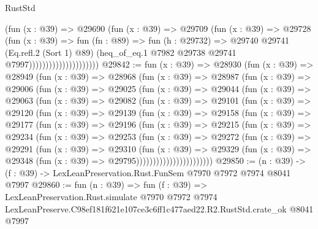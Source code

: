 \begin{lexlean}{RustStd}
\begin{coremodule}
                                    (fun (x : @39) =>
                                    @29690
                                      (fun (x : @39) =>
                                      @29709
                                        (fun (x : @39) =>
                                        @29728
                                          (fun (x : @39) =>
                                          fun (fn : @89) =>
                                          fun (h : @29732) =>
                                          @29740
                                            @29741
                                            (Eq.refl.{2} (Sort 1) @89)
                                            (heq_of_eq.{1}
                                              @7982
                                              @29738
                                              @29741
                                              @7997)))))))))))))))))))))
@29842 := fun (x : @39) =>
  @28930
    (fun (x : @39) =>
    @28949
      (fun (x : @39) =>
      @28968
        (fun (x : @39) =>
        @28987
          (fun (x : @39) =>
          @29006
            (fun (x : @39) =>
            @29025
              (fun (x : @39) =>
              @29044
                (fun (x : @39) =>
                @29063
                  (fun (x : @39) =>
                  @29082
                    (fun (x : @39) =>
                    @29101
                      (fun (x : @39) =>
                      @29120
                        (fun (x : @39) =>
                        @29139
                          (fun (x : @39) =>
                          @29158
                            (fun (x : @39) =>
                            @29177
                              (fun (x : @39) =>
                              @29196
                                (fun (x : @39) =>
                                @29215
                                  (fun (x : @39) =>
                                  @29234
                                    (fun (x : @39) =>
                                    @29253
                                      (fun (x : @39) =>
                                      @29272
                                        (fun (x : @39) =>
                                        @29291
                                          (fun (x : @39) =>
                                          @29310
                                            (fun (x : @39) =>
                                            @29329
                                              (fun (x : @39) =>
                                              @29348 (fun (x : @39) => @29795)))))))))))))))))))))))
@29850 := (n : @39) -> (f : @39) -> LexLeanPreservation.Rust.FunSem @7970 @7972 @7974 @8041 @7997
@29860 := fun (n : @39) =>
  fun (f : @39) =>
  LexLeanPreservation.Rust.simulate
    @7970
    @7972
    @7974
    LexLeanPreserve.C98ef181f621e107ce3c6ff1c477aed22.R2.RustStd.crate_ok
    @8041
    @7997
\end{coremodule}
\end{lexlean}
